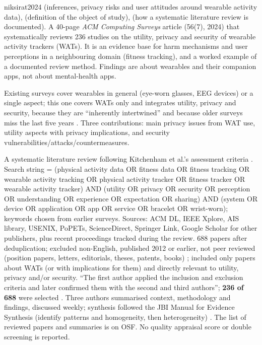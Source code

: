 \begin{papercard}{niksirat2024}
  (inferences, privacy risks and user attitudes around wearable activity data),  (definition of the object of study),  (how a systematic literature review is documented). A 40-page \emph{ACM Computing Surveys} article (56(7), 2024) that systematically reviews 236 studies on the utility, privacy and security of wearable activity trackers (WATs). It is an evidence base for harm mechanisms and user perceptions in a neighbouring domain (fitness tracking), and a worked example of a documented review method. Findings are about wearables and their companion apps, not about mental-health apps.

 Existing surveys cover wearables in general (eye-worn glasses, EEG devices) or a single aspect; this one covers WATs only and integrates utility, privacy and security, because they are ``inherently intertwined'' and because older surveys miss the last five years . Three contributions: main privacy issues from WAT use, utility aspects with privacy implications, and security vulnerabilities/attacks/countermeasures.

 A systematic literature review following Kitchenham et al.'s assessment criteria . Search string = (physical activity data OR fitness data OR fitness tracking OR wearable activity tracking OR physical activity tracker OR fitness tracker OR wearable activity tracker) AND (utility OR privacy OR security OR perception OR understanding OR experience OR expectation OR sharing) AND (system OR device OR application OR app OR service OR bracelet OR wrist-worn); keywords chosen from earlier surveys. Sources: ACM DL, IEEE Xplore, AIS library, USENIX, PoPETs, ScienceDirect, Springer Link, Google Scholar for other publishers, plus recent proceedings tracked during the review. 688 papers after deduplication; excluded non-English, published 2012 or earlier, not peer reviewed (position papers, letters, editorials, theses, patents, books) ; included only papers about WATs (or with implications for them) and directly relevant to utility, privacy and/or security. ``The first author applied the inclusion and exclusion criteria and later confirmed them with the second and third authors''; \textbf{236 of 688} were selected . Three authors summarised context, methodology and findings, discussed weekly; synthesis followed the JBI Manual for Evidence Synthesis (identify patterns and homogeneity, then heterogeneity) . The list of reviewed papers and summaries is on OSF. No quality appraisal score or double screening is reported.


\end{papercard}
